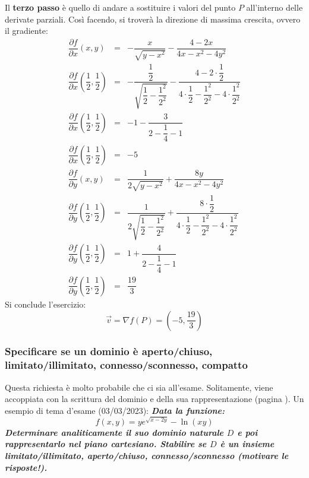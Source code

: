 \documentclass[a4paper]{article}
\begin{document}
	\noindent
	Il \textbf{terzo passo} è quello di andare a sostituire i valori del punto $P$ all'interno delle derivate parziali. Così facendo, si troverà la direzione di massima crescita, ovvero il gradiente:
	\begin{equation*}
		\begin{array}{rcl}
			\dfrac{\partial f}{\partial x}\left(x,y\right) &=& -\dfrac{x}{\sqrt{y-x^{2}}} - \dfrac{4-2x}{4x-x^{2}-4y^{2}} \\ [1.5em]
			\dfrac{\partial f}{\partial x}\left(\dfrac{1}{2},\dfrac{1}{2}\right) &=& -\dfrac{\dfrac{1}{2}}{\sqrt{\dfrac{1}{2}-\dfrac{1^{2}}{2^{2}}}} - \dfrac{4-2 \cdot \dfrac{1}{2}}{4 \cdot \dfrac{1}{2} - \dfrac{1^{2}}{2^{2}} -4 \cdot \dfrac{1^{2}}{2^{2}}} \\ [3em]
			\dfrac{\partial f}{\partial x}\left(\dfrac{1}{2},\dfrac{1}{2}\right) &=& -1 - \dfrac{3}{2 - \dfrac{1}{4} - 1} \\ [1.5em]
			\dfrac{\partial f}{\partial x}\left(\dfrac{1}{2},\dfrac{1}{2}\right) &=& -5 \\ [3em]
			\dfrac{\partial f}{\partial y}\left(x,y\right) &=& \dfrac{1}{2\sqrt{y-x^{2}}} + \dfrac{8y}{4x-x^{2}-4y^{2}} \\ [1.5em]
			\dfrac{\partial f}{\partial y}\left(\dfrac{1}{2},\dfrac{1}{2}\right) &=& \dfrac{1}{2\sqrt{\dfrac{1}{2} - \dfrac{1^{2}}{2^{2}}}} + \dfrac{8 \cdot \dfrac{1}{2}}{4 \cdot \dfrac{1}{2} - \dfrac{1^{2}}{2^{2}} - 4 \cdot \dfrac{1^{2}}{2^{2}}} \\ [3em]
			\dfrac{\partial f}{\partial y}\left(\dfrac{1}{2},\dfrac{1}{2}\right) &=& 1 + \dfrac{4}{2 - \dfrac{1}{4} - 1} \\ [1.5em]
			\dfrac{\partial f}{\partial y}\left(\dfrac{1}{2},\dfrac{1}{2}\right) &=& \dfrac{19}{3}
		\end{array}
	\end{equation*}
	Si conclude l'esercizio:
	\begin{equation*}
		\overrightarrow{v} = \nabla f\left(P\right) = \left(-5, \dfrac{19}{3}\right)
	\end{equation*}\newpage

	\subsubsection{Specificare se un dominio è aperto/chiuso, limitato/illimitato, connesso/sconnesso, compatto}

	Questa richiesta è molto probabile che ci sia all'esame. Solitamente, viene accoppiata con la scrittura del dominio e della sua rappresentazione (pagina \pageref{par: rappresentare la funzione nel piano cartesiano}). Un esempio di tema d'esame (03/03/2023): \textcolor{Green4}{\textbf{\emph{Data la funzione:}}
	\begin{equation*}
		f\left(x,y\right) = y e^{\sqrt{x-2y}} - \ln\left(xy\right)
	\end{equation*}
	\textbf{\emph{Determinare analiticamente il suo dominio naturale $D$ e poi rappresentarlo nel piano cartesiano. Stabilire se $D$ è un insieme limitato/illimitato, aperto/chiuso, connesso/sconnesso (motivare le risposte!).}}}\newline
\end{document}
